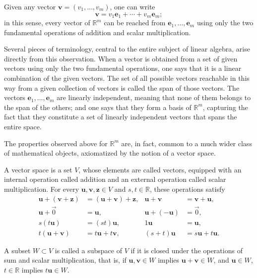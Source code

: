 Given any vector $\mathbf{v} = (v_1, \dots, v_m)$, one can write
\[
\mathbf{v} = v_1 \mathbf{e}_1 + \cdots + v_m \mathbf{e}_m;
\] in this sense, every vector of $\mathbb{R}^m$ can be reached from $\mathbf{e}_1, \dots, \mathbf{e}_m$ using only the two fundamental operations of addition and scalar multiplication.

Several pieces of terminology, central to the entire subject of linear algebra, arise directly from this observation. When a vector is obtained from a set of given vectors using only the two fundamental operations, one says that it is a linear combination of the given vectors. The set of all possible vectors reachable in this way from a given collection of vectors is called the span of those vectors. The vectors $\mathbf{e}_1, \dots, \mathbf{e}_m$ are linearly independent, meaning that none of them belongs to the span of the others; and one says that they form a basis of $\mathbb{R}^m$, capturing the fact that they constitute a set of linearly independent vectors that spans the entire space.

The properties observed above for $\mathbb{R}^m$ are, in fact, common to a much wider class of mathematical objects, axiomatized by the notion of a vector space.

\begin{definition}
A vector space is a set $V$, whose elements are called vectors, equipped with an internal operation called addition and an external operation called scalar multiplication. For every $\mathbf{u},\mathbf{v},\mathbf{z}\in V$ and $s,t\in\mathbb{R}$, these operations satisfy
\[
\begin{aligned}
\mathbf{u}+(\mathbf{v}+\mathbf{z})&=(\mathbf{u}+\mathbf{v})+\mathbf{z},
&\mathbf{u}+\mathbf{v}&=\mathbf{v}+\mathbf{u},\\
\mathbf{u}+\vec{0}&=\mathbf{u},
&\mathbf{u}+(-\mathbf{u})&=\vec{0},\\
s(t\mathbf{u})&=(st)\mathbf{u},
&1\mathbf{u}&=\mathbf{u},\\
t(\mathbf{u}+\mathbf{v})&=t\mathbf{u}+t\mathbf{v},
&(s+t)\mathbf{u}&=s\mathbf{u}+t\mathbf{u}.
\end{aligned}
\]
\end{definition}

\begin{definition}[Subspace]
A subset $W \subset V$ is called a subspace of $V$ if it is closed under the operations of sum and scalar multiplication, that is, if $\mathbf{u}, \mathbf{v} \in W$ implies $\mathbf{u}+\mathbf{v} \in W$, and $\mathbf{u} \in W$, $t \in \mathbb{R}$ implies $t\mathbf{u} \in W$.
\end{definition}

